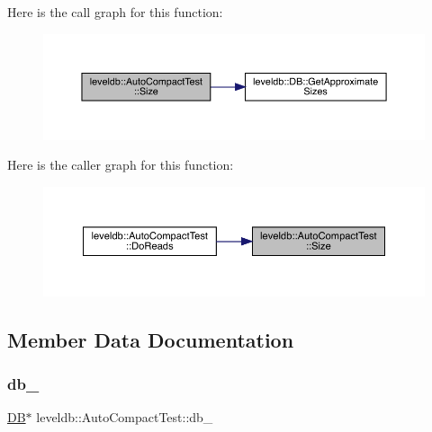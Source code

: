 Here is the call graph for this function\+:
\nopagebreak
\begin{figure}[H]
\begin{center}
\leavevmode
\includegraphics[width=350pt]{classleveldb_1_1_auto_compact_test_a4be489ee1b3868f61d9976935e9b2bc4_cgraph}
\end{center}
\end{figure}
Here is the caller graph for this function\+:
\nopagebreak
\begin{figure}[H]
\begin{center}
\leavevmode
\includegraphics[width=350pt]{classleveldb_1_1_auto_compact_test_a4be489ee1b3868f61d9976935e9b2bc4_icgraph}
\end{center}
\end{figure}


\subsection{Member Data Documentation}
\mbox{\label{classleveldb_1_1_auto_compact_test_a9e8d5f9bf0546b7d7fdf2128c66d8761}} 
\subsubsection{\texorpdfstring{db\_}{db\_}}
{\footnotesize\ttfamily \mbox{\hyperlink{classleveldb_1_1_d_b}{DB}}$\ast$ leveldb\+::\+Auto\+Compact\+Test\+::db\+\_\+}

\mbox{\label{classleveldb_1_1_auto_compact_test_a9caaa257e508397f94fbe646893b7b3b}} 
